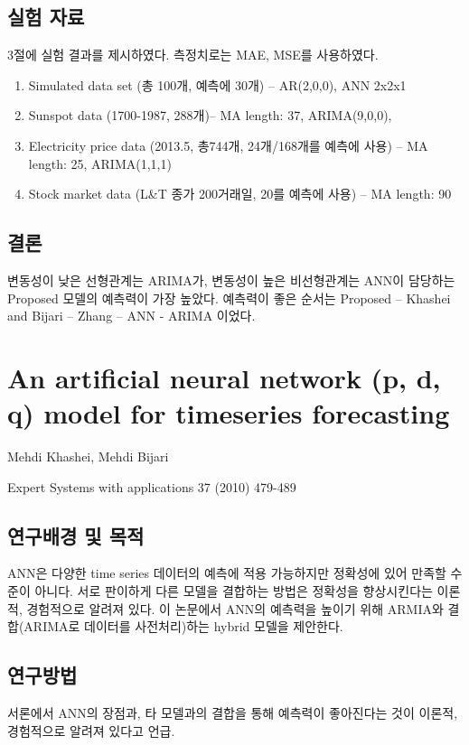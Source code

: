 \documentclass[ %
    a4paper,    %
    amsmath,    %
    itemph,     %
11pt]{oblivoir}     %
\begin{document}
\subsection{실험 자료}
3절에 실험 결과를 제시하였다. 측정치로는 MAE, MSE를 사용하였다.

\begin{enumerate}\tightlist
\item Simulated data set (총 100개, 예측에 30개) -- AR(2,0,0), ANN 2x2x1
\item Sunspot data (1700-1987, 288개)-- MA length: 37, ARIMA(9,0,0),
\item Electricity price data (2013.5, 총744개, 24개/168개를 예측에 사용) -- MA length: 25, ARIMA(1,1,1)
\item Stock market data (L\&T 종가 200거래일, 20를 예측에 사용) -- MA length: 90
\end{enumerate}

\subsection{결론}
변동성이 낮은 선형관계는 ARIMA가, 변동성이 높은 비선형관계는 ANN이 담당하는 Proposed 모델의 예측력이 가장 높았다. 예측력이 좋은 순서는 Proposed -- Khashei and Bijari -- Zhang -- ANN - ARIMA 이었다.


\section{An artificial neural network (p, d, q) model for timeseries forecasting\cite{khashei2010}}

\begin{description}\tightlist
\item[저자] Mehdi Khashei, Mehdi Bijari
\item[학술지] Expert Systems with applications 37 (2010) 479-489
\end{description}

\subsection{연구배경 및 목적}
ANN은 다양한 time series 데이터의 예측에 적용 가능하지만 정확성에 있어 만족할 수준이 아니다. 서로 판이하게 다른 모델을 결합하는 방법은 정확성을 향상시킨다는 이론적, 경험적으로 알려져 있다.  이 논문에서 ANN의 예측력을 높이기 위해 ARMIA와 결합(ARIMA로 데이터를 사전처리)하는 hybrid 모델을 제안한다.

\subsection{연구방법}
 서론에서 ANN의 장점과, 타 모델과의 결합을 통해 예측력이 좋아진다는 것이 이론적, 경험적으로 알려져 있다고 언급.
\end{document}
